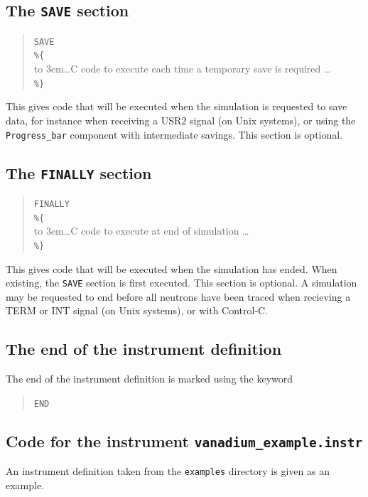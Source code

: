{\subsection{The \texttt{SAVE} section}

\begin{quote}
  \texttt{SAVE} \\
  \verb|%{| \\
  \hbox to 3em{}\ldots C code to execute each time a temporary save is required \ldots \\
  \verb|%}|
\end{quote} 
This gives code that will be executed when the simulation is requested to save data, for instance when receiving a USR2 signal (on Unix systems), or using the \verb+Progress_bar+ component with intermediate savings. This section is optional.

\subsection{The \texttt{FINALLY} section}

\begin{quote}
  \texttt{FINALLY} \\
  \verb|%{| \\
  \hbox to 3em{}\ldots C code to execute at end of simulation \ldots \\
  \verb|%}|
\end{quote}
This gives code that will be executed when the simulation has
ended. When existing, the \texttt{SAVE} section is first executed. This section is optional.
A simulation may be requested to end before all neutrons have been traced when recieving a TERM or INT signal (on Unix systems), or with Control-C.
 


\subsection{The end of the instrument definition}

The end of the instrument definition is marked using the keyword
\begin{quote}
  \texttt{END}
\end{quote}

\subsection{Code for the instrument \texttt{vanadium\_example.instr}}
\label{s:vanadium_example.instr}
An instrument definition taken from the \texttt{examples} directory is
given as an example.

}
